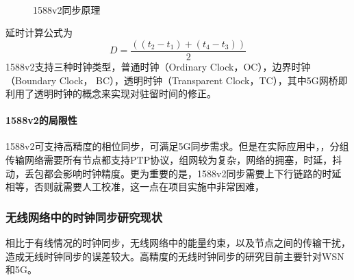 \documentclass[UTF8,a4paper,12pt]{ctexart}
\numberwithin{equation}{section}
\begin{document}
\begin{figure}[htb] 
	\caption{1588v2同步原理\textsuperscript{\cite{shereen2019next}}}
\end{figure}

延时计算公式为
\begin{equation}
	D = \frac{((t_2-t_1)+(t_4-t_3))}{2} 
\end{equation}
1588v2支持三种时钟类型，普通时钟（Ordinary Clock，OC），边界时钟（Boundary Clock， BC），透明时钟（Transparent Clock，TC），其中5G网桥即利用了透明时钟的概念来实现对驻留时间的修正。
\paragraph{1588v2的局限性}
1588v2可支持高精度的相位同步，可满足5G同步需求。但是在实际应用中，，分组传输网络需要所有节点都支持PTP协议，组网较为复杂，网络的拥塞，时延，抖动，丢包都会影响时钟精度。更为重要的是，1588v2同步需要上下行链路的时延相等，否则就需要人工校准，这一点在项目实施中非常困难，

\subsubsection{无线网络中的时钟同步研究现状}
相比于有线情况的时钟同步，无线网络中的能量约束，以及节点之间的传输干扰，造成无线时钟同步的误差较大。高精度的无线时钟同步的研究目前主要针对WSN和5G。
\end{document}
